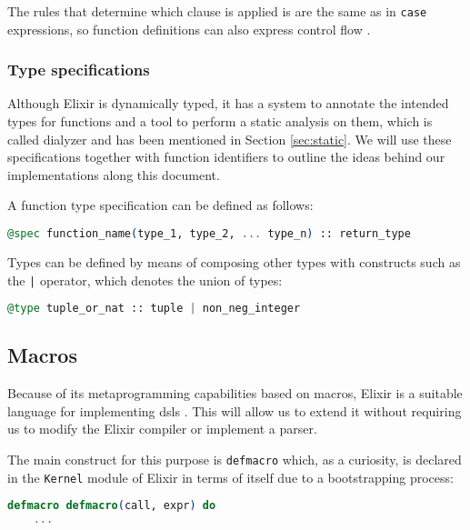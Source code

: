 The rules that determine which clause is applied is are the same as in
\verb|case| expressions, so function definitions can also express control flow
\citep{programmingElixir}.

\subsubsection{Type specifications}
\label{prelim:typespecs}

Although Elixir is dynamically typed, it has a system to annotate the intended
types for functions and a tool to perform a static analysis on them, which is 
called \gls{dialyzer} \citep{Dialyzer} and has been mentioned in Section
\ref{sec:static}. We will use these specifications together with function
identifiers to outline the ideas behind our implementations along this document.

A function type specification can be defined as follows: 

\begin{lstlisting}[language=elixir,numbers=none,frame=none]
@spec function_name(type_1, type_2, ... type_n) :: return_type
\end{lstlisting}

Types can be defined by means of composing other types with constructs such as
the \verb+|+ operator, which denotes the union of types:

\begin{lstlisting}[language=elixir,numbers=none,frame=none]
@type tuple_or_nat :: tuple | non_neg_integer
\end{lstlisting}

\subsection{Macros}

Because of its metaprogramming capabilities based on macros, Elixir is a
suitable language for implementing \gls{dsl}s \citep{metaprogrammingElixir}.
This will allow us to extend it without requiring us to modify the Elixir
compiler or implement a parser.

The main construct for this purpose is \verb|defmacro| which, as a curiosity, is
declared in the \verb|Kernel| module of Elixir in terms of itself due to a
bootstrapping process:

\begin{lstlisting}[language=elixir,numbers=none,frame=none]
  defmacro defmacro(call, expr) do
    ...
\end{lstlisting}

